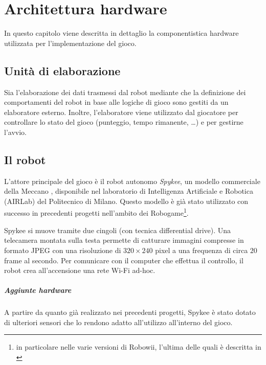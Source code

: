 \chapter{Architettura hardware}
\label{cap:architettura}

In questo capitolo viene descritta in dettaglio la componentistica hardware utilizzata per l'implementazione del gioco.

\section{Unità di elaborazione}
Sia l'elaborazione dei dati trasmessi dal robot mediante che la definizione dei comportamenti del robot in base alle logiche di gioco sono gestiti da un elaboratore esterno. Inoltre, l'elaboratore viene utilizzato dal giocatore per controllare lo stato del gioco (punteggio, tempo rimanente, \dots) e per gestirne l'avvio.

\section{Il robot}


L'attore principale del gioco è il robot autonomo \emph{Spykee}, un modello commerciale della Meccano \cite{spykeeweb}, disponibile nel laboratorio di Intelligenza Artificiale e Robotica (AIRLab) del Politecnico di Milano. Questo modello è già stato utilizzato con successo in precedenti progetti nell'ambito dei Robogame\footnote{in particolare nelle varie versioni di Robowii, l'ultima delle quali è descritta in \cite{robowii}}.

Spykee si muove tramite due cingoli (con tecnica differential drive). Una telecamera montata sulla testa permette di catturare immagini compresse in formato JPEG con una risoluzione di $320 \times 240$ pixel a una frequenza di circa $20$ frame al secondo. Per comunicare con il computer che effettua il controllo, il robot crea all'accensione una rete Wi-Fi ad-hoc.

\paragraph{Aggiunte hardware} A partire da quanto già realizzato nei precedenti progetti, Spykee è stato dotato di ulteriori sensori che lo rendono adatto all'utilizzo all'interno del gioco.

